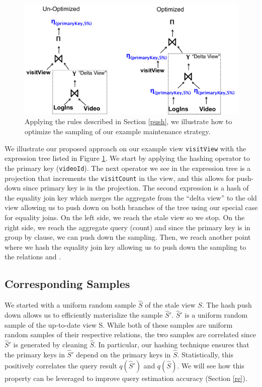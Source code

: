 \begin{figure}[t]
\centering
 \includegraphics[scale=0.22]{figs/example_expression_tree_2.pdf} \vspace{-.5em}
 \caption{Applying the rules described in Section \ref{push}, we illustrate how to optimize the sampling of our example maintenance strategy. \label{exexpr2}}\vspace{-1em}
\end{figure}

\begin{example}
We illustrate our proposed approach on our example view \texttt{visitView} with the expression tree listed in Figure \ref{exexpr2}. 
We start by applying the hashing operator to the primary key (\texttt{videoId}).
The next operator we see in the expression tree is a projection that increments the \texttt{visitCount} in the view, and this allows
for push-down since primary key is in the projection.
The second expression is a hash of the equality join key which merges the aggregate from the ``delta view'' to the old view allowing us to push down on both branches of the tree using our special case for equality joins.
On the left side, we reach the stale view so we stop.
On the right side, we reach the aggregate query (count) and since the primary key is in group by clause, we can push down the sampling.
Then, we reach another point where we hash the equality join key allowing us to push down the sampling to the relations  and .
\end{example}

\subsection{Corresponding Samples}
We started with a uniform random sample $\widehat{S}$ of the stale view $S$.
The hash push down allows us to efficiently materialize the sample $\widehat{S}'$.
$\widehat{S}'$ is a uniform random sample of the up-to-date view S.
While both of these samples are uniform random samples of their respective relations, 
the two samples are correlated since $\widehat{S}'$ is generated by cleaning $\widehat{S}$.
In particular, our hashing technique ensures that the primary keys in $\widehat{S}'$ depend on the primary keys in $\widehat{S}$.
Statistically, this positively correlates the query result $q(\widehat{S}')$ and $q(\widehat{S})$. 
We will see how this property can be leveraged to improve query estimation accuracy (Section \ref{re}). 

